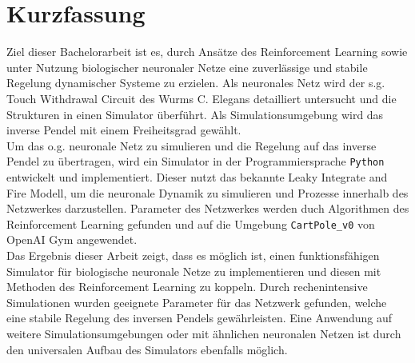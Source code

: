 \section*{Kurzfassung}
%
Ziel dieser Bachelorarbeit ist es, durch Ansätze des Reinforcement Learning sowie unter Nutzung biologischer neuronaler Netze eine zuverlässige und stabile Regelung dynamischer Systeme zu erzielen. Als neuronales Netz wird der s.g. \glqq Touch Withdrawal Circuit \grqq{} des Wurms C. Elegans detailliert untersucht und die Strukturen in einen Simulator überführt. Als Simulationsumgebung wird das inverse Pendel mit einem Freiheitsgrad gewählt.\\
Um das o.g. neuronale Netz zu simulieren und die Regelung auf das inverse Pendel zu übertragen, wird ein Simulator in der Programmiersprache \texttt{Python} entwickelt und implementiert. Dieser nutzt das bekannte Leaky Integrate and Fire Modell, um die neuronale Dynamik zu simulieren und Prozesse innerhalb des Netzwerkes darzustellen. Parameter des Netzwerkes werden duch Algorithmen des Reinforcement Learning gefunden und auf die Umgebung \texttt{CartPole\_v0} von OpenAI Gym angewendet.\\
Das Ergebnis dieser Arbeit zeigt, dass es möglich ist, einen funktionsfähigen Simulator für biologische neuronale Netze zu implementieren und diesen mit Methoden des Reinforcement Learning zu koppeln. Durch rechenintensive Simulationen wurden geeignete Parameter für das Netzwerk gefunden, welche eine stabile Regelung des inversen Pendels gewährleisten. Eine Anwendung auf weitere Simulationsumgebungen oder mit ähnlichen neuronalen Netzen ist durch den universalen Aufbau des Simulators ebenfalls möglich.

